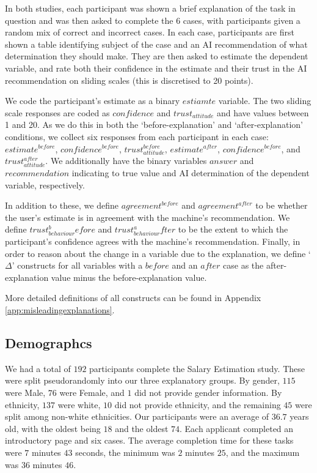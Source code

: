 In both studies, each participant was shown a brief explanation of the task in question and was then asked to complete the 6 cases, with participants given a random mix of correct and incorrect cases. In each case, participants are first shown a table identifying subject of the case and an AI recommendation of what determination they should make. They are then asked to estimate the dependent variable, and rate both their confidence in the estimate and their trust in the AI recommendation on sliding scales (this is discretised to 20 points).

We code the participant's estimate as a binary $estiamte$ variable. The two sliding scale responses are coded as $confidence$ and $trust_{attitude}$ and have values between 1 and 20. As we do this in both the `before-explanation' and `after-explanation' conditions, we collect six responses from each participant in each case:  $estimate^{before}$, $confidence^{before}$, $trust_{attitude}^{before}$, $estimate^{after}$, $confidence^{before}$, and $trust_{attitude}^{after}$.  We additionally have the binary variables $answer$ and $recommendation$ indicating to true value and AI determination of the dependent variable, respectively.

In addition to these, we define $agreement^{before}$ and $agreement^{after}$ to be whether the user's estimate is in agreement with the machine's recommendation. We define $trust_{behaviour}^before$ and $trust_{behaviour}^after$ to be the extent to which the participant's confidence agrees with the machine's recommendation. Finally, in order to reason about the change in a variable due to the explanation, we define `$\Delta$' constructs for all variables with a $before$ and an $after$ case as the after-explanation value minus the before-explanation value.

More detailed definitions of all constructs can be found in Appendix \ref{app:misleadingexplanations}.

\subsection{Demographcs}

We had a total of $192$ participants complete the Salary Estimation study. These were split pseudorandomly into our three explanatory groups. By gender, $115$ were Male, $76$ were Female, and $1$ did not provide gender information. By ethnicity, $137$ were white, $10$ did not provide ethnicity, and the remaining $45$ were split among non-white ethnicities. Our participants were an average of $36.7$ years old, with the oldest being $18$ and the oldest $74$. Each applicant completed an introductory page and six cases. The average completion time for these tasks were $7$ minutes $43$ seconds, the minimum was $2$ minutes $25$, and the maximum was $36$ minutes $46$.

